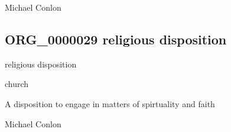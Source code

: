 \documentclass[letterpaper,10pt,english]{sphinxmanual}
\begin{document}
\begin{sphinxShadowBox}

\sphinxAtStartPar
Michael Conlon 
\end{sphinxShadowBox}
\begin{quote}

\ignorespaces \end{quote}


\subsection{ORG\_0000029 \sphinxhyphen{} religious disposition}
\label{\detokenize{doc-ORG_0000029:org-0000029-religious-disposition}}\label{\detokenize{doc-ORG_0000029:index-0}}\label{\detokenize{doc-ORG_0000029::doc}}
\begin{sphinxShadowBox}

\sphinxAtStartPar
religious disposition
\end{sphinxShadowBox}

\begin{sphinxShadowBox}

\sphinxAtStartPar
church
\end{sphinxShadowBox}

\begin{sphinxShadowBox}

\sphinxAtStartPar
{\hyperref[\detokenize{doc-BFO_0000016::doc}]{}}
\end{sphinxShadowBox}

\begin{sphinxShadowBox}

\sphinxAtStartPar
A disposition to engage in matters of spirtuality and faith
\end{sphinxShadowBox}

\begin{sphinxShadowBox}

\sphinxAtStartPar
Michael Conlon 
\end{sphinxShadowBox}
\end{document}
